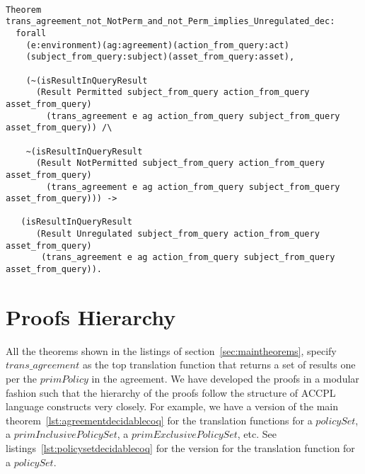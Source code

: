 \begin{lstlisting}

Theorem trans_agreement_not_NotPerm_and_not_Perm_implies_Unregulated_dec:
  forall
    (e:environment)(ag:agreement)(action_from_query:act)
    (subject_from_query:subject)(asset_from_query:asset),

    (~(isResultInQueryResult 
      (Result Permitted subject_from_query action_from_query asset_from_query)
        (trans_agreement e ag action_from_query subject_from_query asset_from_query)) /\

    ~(isResultInQueryResult 
      (Result NotPermitted subject_from_query action_from_query asset_from_query)
        (trans_agreement e ag action_from_query subject_from_query asset_from_query))) ->

   (isResultInQueryResult 
      (Result Unregulated subject_from_query action_from_query asset_from_query)
       (trans_agreement e ag action_from_query subject_from_query asset_from_query)).
\end{lstlisting}


\section{Proofs Hierarchy}

All the theorems shown in the listings of section~\ref{sec:maintheorems}, specify $trans\_agreement$ as the top translation function that returns a set of results one per the $primPolicy$ in the agreement. We have developed the proofs in a modular fashion such that the hierarchy of the proofs follow the structure of \ac{ACCPL} language constructs very closely. For example, we have a version of the main theorem~\ref{lst:agreementdecidablecoq} for the translation functions for a $policySet$, a $primInclusivePolicySet$, a $primExclusivePolicySet$, etc. See listings~\ref{lst:policysetdecidablecoq} for the version for the translation function for a $policySet$.

